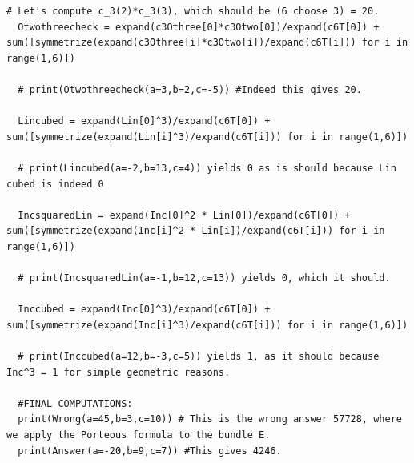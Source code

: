 \documentclass[reqno, 11pt]{amsart}
\theoremstyle{plain}
\theoremstyle{remark}
\begin{document}
\begin{lstlisting}[basicstyle=\ttfamily\tiny]
  # Let's compute c_3(2)*c_3(3), which should be (6 choose 3) = 20.
  Otwothreecheck = expand(c3Othree[0]*c3Otwo[0])/expand(c6T[0]) + sum([symmetrize(expand(c3Othree[i]*c3Otwo[i])/expand(c6T[i])) for i in range(1,6)])
  
  # print(Otwothreecheck(a=3,b=2,c=-5)) #Indeed this gives 20.
  
  Lincubed = expand(Lin[0]^3)/expand(c6T[0]) + sum([symmetrize(expand(Lin[i]^3)/expand(c6T[i])) for i in range(1,6)])
  
  # print(Lincubed(a=-2,b=13,c=4)) yields 0 as is should because Lin cubed is indeed 0
  
  IncsquaredLin = expand(Inc[0]^2 * Lin[0])/expand(c6T[0]) + sum([symmetrize(expand(Inc[i]^2 * Lin[i])/expand(c6T[i])) for i in range(1,6)])
  
  # print(IncsquaredLin(a=-1,b=12,c=13)) yields 0, which it should. 
  
  Inccubed = expand(Inc[0]^3)/expand(c6T[0]) + sum([symmetrize(expand(Inc[i]^3)/expand(c6T[i])) for i in range(1,6)])
  
  # print(Inccubed(a=12,b=-3,c=5)) yields 1, as it should because Inc^3 = 1 for simple geometric reasons.
  
  #FINAL COMPUTATIONS:
  print(Wrong(a=45,b=3,c=10)) # This is the wrong answer 57728, where we apply the Porteous formula to the bundle E.
  print(Answer(a=-20,b=9,c=7)) #This gives 4246.
\end{lstlisting}





  

  
\end{document}
